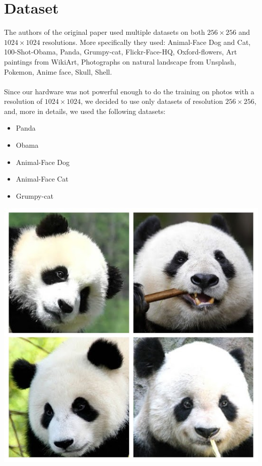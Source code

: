 \documentclass[12pt]{article}
\begin{document}
\section{Dataset}
\large
The authors of the original paper used multiple datasets on both $256 \times 256$ and $1024 \times 1024$ resolutions. More specifically
they used: Animal-Face Dog and Cat, 100-Shot-Obama, Panda, Grumpy-cat, Flickr-Face-HQ, 
Oxford-flowers, Art paintings from WikiArt, Photographs on natural landscape from Unsplash, 
Pokemon, Anime face, Skull, Shell.\\\\ 
Since our hardware was not powerful enough to do the training on photos with a resolution of $1024 \times 1024$, we decided to use only
datasets of resolution $256 \times 256$, and, more in details, we used the following datasets: 
\begin{itemize}
	\item Panda
	\item Obama
	\item Animal-Face Dog
	\item Animal-Face Cat
	\item Grumpy-cat\\
\end{itemize}
\begin{minipage}[t]{0.2\textwidth}
	\includegraphics[width=1\textwidth]{Images/panda.jpg}
\end{minipage}
\end{document}
